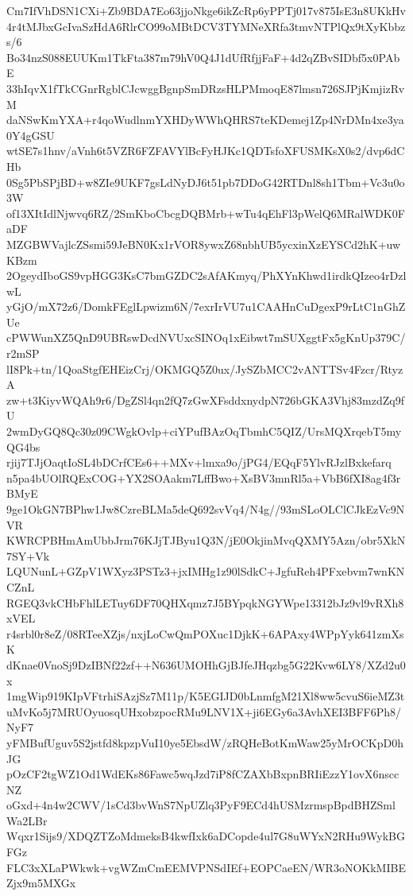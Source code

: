 Cm7IfVhDSN1CXi+Zb9BDA7Eo63jjoNkge6ikZcRp6yPPTj017v875IsE3n8UKkHv
4r4tMJbxGcIvaSzHdA6RlrCO99oMBtDCV3TYMNeXRfa3tmvNTPlQx9tXyKbbzs/6
Bo34nzS088EUUKm1TkFta387m79hV0Q4J1dUfRfjjFaF+4d2qZBvSIDbf5x0PAbE
33hIqvX1fTkCGnrRgblCJcwggBgnpSmDRzsHLPMmoqE87lmsn726SJPjKmjizRvM
daNSwKmYXA+r4qoWudlnmYXHDyWWhQHRS7teKDemej1Zp4NrDMn4xe3ya0Y4gGSU
wtSE7s1hnv/aVnh6t5VZR6FZFAVYlBcFyHJKc1QDTsfoXFUSMKsX0s2/dvp6dCHb
0Sg5PbSPjBD+w8ZIe9UKF7gsLdNyDJ6t51pb7DDoG42RTDnl8sh1Tbm+Vc3u0o3W
of13XItIdlNjwvq6RZ/2SmKboCbcgDQBMrb+wTu4qEhFl3pWelQ6MRalWDK0FaDF
MZGBWVajlcZSsmi59JeBN0Kx1rVOR8ywxZ68nbhUB5ycxinXzEYSCd2hK+uwKBzm
2OgeydIboGS9vpHGG3KsC7bmGZDC2sAfAKmyq/PhXYnKhwd1irdkQIzeo4rDzlwL
yGjO/mX72z6/DomkFEglLpwizm6N/7exrIrVU7u1CAAHnCuDgexP9rLtC1nGhZUe
cPWWunXZ5QnD9UBRswDcdNVUxcSINOq1xEibwt7mSUXggtFx5gKnUp379C/r2mSP
lI8Pk+tn/1QoaStgfEHEizCrj/OKMGQ5Z0ux/JySZbMCC2vANTTSv4Fzcr/RtyzA
zw+t3KiyvWQAh9r6/DgZSl4qn2fQ7zGwXFsddxnydpN726bGKA3Vhj83mzdZq9fU
2wmDyGQ8Qc30z09CWgkOvlp+ciYPufBAzOqTbmhC5QIZ/UrsMQXrqebT5myQG4bs
rjij7TJjOaqtIoSL4bDCrfCEs6++MXv+lmxa9o/jPG4/EQqF5YlvRJzlBxkefarq
n5pa4bUOlRQExCOG+YX2SOAakm7LffBwo+XsBV3mnRl5a+VbB6fXI8ag4f3rBMyE
9ge1OkGN7BPhw1Jw8CzreBLMa5deQ692svVq4/N4g//93mSLoOLClCJkEzVc9NVR
KWRCPBHmAmUbbJrm76KJjTJByu1Q3N/jE0OkjinMvqQXMY5Azn/obr5XkN7SY+Vk
LQUNunL+GZpV1WXyz3PSTz3+jxIMHg1z90lSdkC+JgfuReh4PFxebvm7wnKNCZnL
RGEQ3vkCHbFhlLETuy6DF70QHXqmz7J5BYpqkNGYWpe13312bJz9vl9vRXh8xVEL
r4srbl0r8eZ/08RTeeXZjs/nxjLoCwQmPOXuc1DjkK+6APAxy4WPpYyk641zmXsK
dKnae0VnoSj9DzIBNf22zf++N636UMOHhGjBJfeJHqzbg5G22Kvw6LY8/XZd2u0x
1mgWip919KIpVFtrhiSAzjSz7M11p/K5EGIJD0bLnmfgM21Xl8ww5cvuS6ieMZ3t
uMvKo5j7MRUOyuosqUHxobzpocRMu9LNV1X+ji6EGy6a3AvhXEI3BFF6Ph8/NyF7
yFMBufUguv5S2jstfd8kpzpVuI10ye5EbsdW/zRQHeBotKmWaw25yMrOCKpD0hJG
pOzCF2tgWZ1Od1WdEKs86Fawc5wqJzd7iP8fCZAXbBxpnBRIiEzzY1ovX6nsccNZ
oGxd+4n4w2CWV/1sCd3bvWnS7NpUZlq3PyF9ECd4hUSMzrmspBpdBHZSmlWa2LBr
Wqxr1Sijs9/XDQZTZoMdmeksB4kwfIxk6aDCopde4ul7G8uWYxN2RHu9WykBGFGz
FLC3xXLaPWkwk+vgWZmCmEEMVPNSdIEf+EOPCaeEN/WR3oNOKkMIBEZjx9m5MXGx
